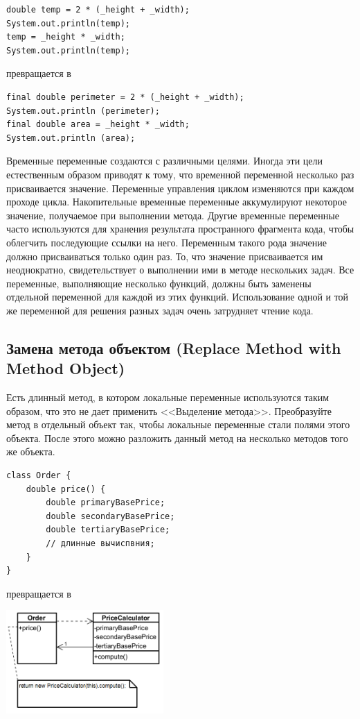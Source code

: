 \documentclass{../../text-style}
\begin{document}
\begin{verbatim}
double temp = 2 * (_height + _width);
System.out.println(temp);
temp = _height * _width;
System.out.println(temp);
\end{verbatim}

превращается в 

\begin{verbatim}
final double perimeter = 2 * (_height + _width);
System.out.println (perimeter);
final double area = _height * _width;
System.out.println (area);
\end{verbatim}

Временные переменные создаются с различными целями. Иногда эти цели естественным образом приводят к тому, что временной переменной несколько раз присваивается значение. Переменные управления циклом изменяются при каждом проходе цикла. Накопительные временные переменные аккумулируют некоторое значение, получаемое при выполнении метода. Другие временные переменные часто используются для хранения результата пространного фрагмента кода, чтобы облегчить последующие ссылки на него. Переменным такого рода значение должно присваиваться только один раз. То, что значение присваивается им неоднократно, свидетельствует о выполнении ими в методе нескольких задач. Все переменные, выполняющие несколько функций, должны быть заменены отдельной переменной для каждой из этих функций. Использование одной и той же переменной для решения разных задач очень затрудняет чтение кода.

\subsection{Замена метода объектом (Replace Method with Method Object)}

Есть длинный метод, в котором локальные переменные используются таким образом, что это не дает применить <<Выделение метода>>. Преобразуйте метод в отдельный объект так, чтобы локальные переменные стали полями этого объекта. После этого можно разложить данный метод на несколько методов того же объекта.

\begin{verbatim}
class Order {
    double price() {
        double primaryBasePrice;
        double secondaryBasePrice;
        double tertiaryBasePrice;
        // длинные вычиспвния;
    }
}
\end{verbatim}

превращается в

\begin{center}
    \includegraphics[width=0.45\textwidth]{methodToObject.png}
\end{center}
\end{document}
